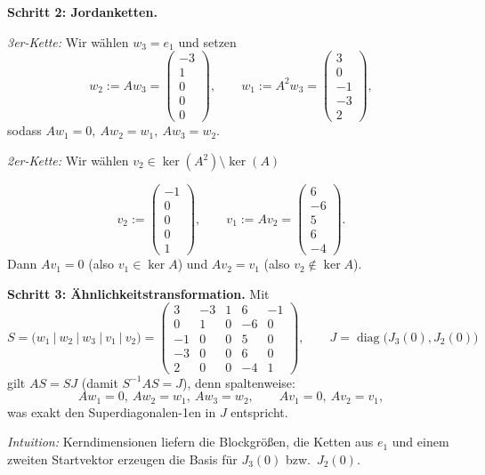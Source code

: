 \documentclass[11pt, a4paper]{article}
\begin{document}
\begin{framed}
\medskip
\textbf{Schritt 2: Jordan\-ketten.}

\emph{3er-Kette:} Wir wählen \(w_3=e_1\) und setzen
\[
w_2:=A w_3=\begin{pmatrix}-3\\1\\0\\0\\0\end{pmatrix},\qquad
w_1:=A^2 w_3=\begin{pmatrix}3\\0\\-1\\-3\\2\end{pmatrix},
\]
sodass \(A w_1=0,\ A w_2=w_1,\ A w_3=w_2\).

\medskip
\emph{2er-Kette:} Wir wählen \(v_2\in\ker(A^2)\setminus\ker(A)\)

\[
v_2:=\begin{pmatrix}-1\\0\\0\\0\\1\end{pmatrix},\qquad
v_1:=A v_2=\begin{pmatrix}6\\-6\\5\\6\\-4\end{pmatrix}.
\]
Dann \(A v_1=0\) (also \(v_1\in\ker A\)) und \(A v_2=v_1\) (also $v_2\notin\ker A$).

\medskip
\textbf{Schritt 3: Ähnlichkeitstransformation.}
Mit
\[
S=\bigl(w_1\ \big|\ w_2\ \big|\ w_3\ \big|\ v_1\ \big|\ v_2\bigr)=
\begin{pmatrix}
  3 & -3 & 1 &  6 & -1\\
  0 &  1 & 0 & -6 &  0\\
 -1 &  0 & 0 &  5 &  0\\
 -3 &  0 & 0 &  6 &  0\\
  2 &  0 & 0 & -4 &  1
\end{pmatrix},\qquad
J=\operatorname{diag}\!\big(J_3(0),J_2(0)\big)
\]
gilt \(AS=SJ\) (damit \(S^{-1}AS=J\)), denn spaltenweise:
\[
A w_1=0,\ A w_2=w_1,\ A w_3=w_2,\qquad A v_1=0,\ A v_2=v_1,
\]
was exakt den Superdiagonalen-1en in \(J\) entspricht.

\medskip\noindent
\emph{Intuition:} Kerndimensionen liefern die Blockgrößen, die Ketten aus \(e_1\) und einem zweiten Startvektor erzeugen die Basis für \(J_3(0)\) bzw.\ \(J_2(0)\).
\end{framed}
\end{document}
